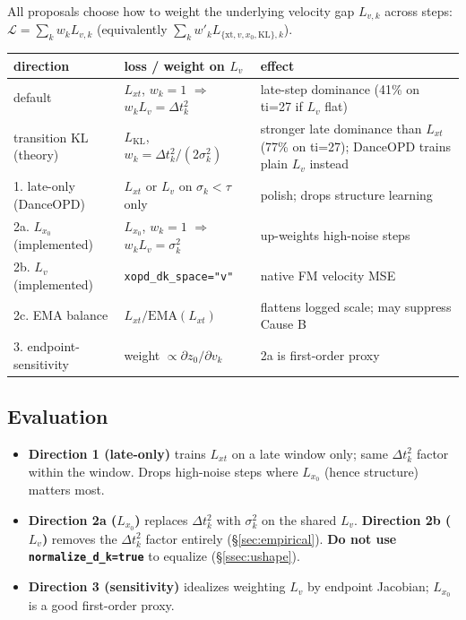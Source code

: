 \documentclass[11pt,a4paper]{article}
\newcommand{\dt}{\Delta t}
\begin{document}
All proposals choose how to weight the underlying velocity gap $L_{v,k}$ across steps:
$\mathcal{L}=\sum_k w_k L_{v,k}$ (equivalently $\sum_k w'_k L_{\{\mathrm{xt},v,x_0,\mathrm{KL}\},k}$).

\begin{center}
\renewcommand{\arraystretch}{1.3}
\footnotesize
\begin{tabular}{@{}p{3.6cm}p{4.5cm}p{5.0cm}@{}}
\toprule
\textbf{direction} & \textbf{loss / weight on $L_v$} & \textbf{effect} \\
\midrule
default & $L_{xt}$, $w_k=1$ $\Rightarrow$ $w_k L_v=\dt_k^2$ & late-step dominance (41\% on ti=27 if $L_v$ flat) \\
transition KL (theory) & $L_{\mathrm{KL}}$, $w_k=\dt_k^2/(2\sigma_k^2)$ & stronger late dominance than $L_{xt}$ (77\% on ti=27); DanceOPD trains plain $L_v$ instead \\
1. late-only (DanceOPD) & $L_{xt}$ or $L_v$ on $\sigma_k<\tau$ only & polish; drops structure learning \\
2a. $L_{x_0}$ (implemented) & $L_{x_0}$, $w_k=1$ $\Rightarrow$ $w_k L_v=\sigma_k^2$ & up-weights high-noise steps \\
2b. $L_v$ (implemented) & \texttt{xopd\_dk\_space="v"} & native FM velocity MSE \\
2c. EMA balance & $L_{xt} / \mathrm{EMA}(L_{xt})$ & flattens logged scale; may suppress Cause B \\
3. endpoint-sensitivity & weight $\propto\partial z_0/\partial v_k$ & 2a is first-order proxy \\
\bottomrule
\end{tabular}
\end{center}

\subsection{Evaluation}
\label{ssec:eval}

\begin{itemize}[leftmargin=1.5em]
\item \textbf{Direction 1 (late-only)} trains $L_{xt}$ on a late window only; same $\dt_k^2$ factor
within the window. Drops high-noise steps where $L_{x_0}$ (hence structure) matters most.
\item \textbf{Direction 2a ($L_{x_0}$)} replaces $\dt_k^2$ with $\sigma_k^2$ on the shared $L_v$.
\textbf{Direction 2b ($L_v$)} removes the $\dt_k^2$ factor entirely (\S\ref{sec:empirical}).
\textbf{Do not use \texttt{normalize\_d\_k=true}} to equalize (\S\ref{ssec:ushape}).
\item \textbf{Direction 3 (sensitivity)} idealizes weighting $L_v$ by endpoint Jacobian; $L_{x_0}$
is a good first-order proxy.
\end{itemize}
\end{document}
